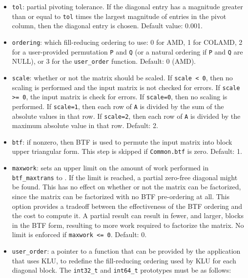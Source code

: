 \documentclass[11pt]{article}
\begin{document}
\begin{itemize}
\item {\tt tol}: partial pivoting tolerance.  If the diagonal entry has a
magnitude greater than or equal to {\tt tol} times the largest magnitude
of entries in the pivot column, then the diagonal entry is chosen.
Default value: 0.001.

\item {\tt ordering}: which fill-reducing ordering to use: 0 for AMD,
1 for COLAMD, 2 for a user-provided permutation {\tt P} and {\tt Q}
(or a natural ordering if {\tt P} and {\tt Q} are NULL), or 3 for
the {\tt user\_order} function.  Default: 0 (AMD).

\item {\tt scale}: whether or not the matrix should be scaled.
If {\tt scale < 0}, then no scaling is performed and the input matrix
is not checked for errors.  If {\tt scale >= 0}, the input matrix is
check for errors.
If {\tt scale=0}, then no scaling is performed.
If {\tt scale=1}, then each row of {\tt A} is divided by the sum of
the absolute values in that row.
If {\tt scale=2}, then each row of {\tt A} is divided by the maximum
absolute value in that row.  Default: 2.

\item {\tt btf}:  if nonzero, then BTF is used to permute the input matrix
into block upper triangular form.  This step is skipped if {\tt Common.btf}
is zero.  Default: 1.

\item {\tt maxwork}: sets an upper limit on the amount of work performed in
{\tt btf\_maxtrans} to .  If the limit is reached,
a partial zero-free diagonal might be found.  This has no effect on whether or
not the matrix can be factorized, since the matrix can be factorized with no
BTF pre-ordering at all.  This option provides a tradeoff between the
effectiveness of the BTF ordering and the cost to compute it.  A partial result
can result in fewer, and larger, blocks in the BTF form, resulting to more work
required to factorize the matrix.  No limit is enforced if {\tt maxwork <= 0}.
Default: 0.

\item {\tt user\_order}: a pointer to a function that can be provided by the
application that uses KLU, to redefine the fill-reducing ordering used by KLU
for each diagonal block.  The \verb'int32_t' and \verb'int64_t' prototypes must be
as follows:


\end{itemize}
\end{document}
